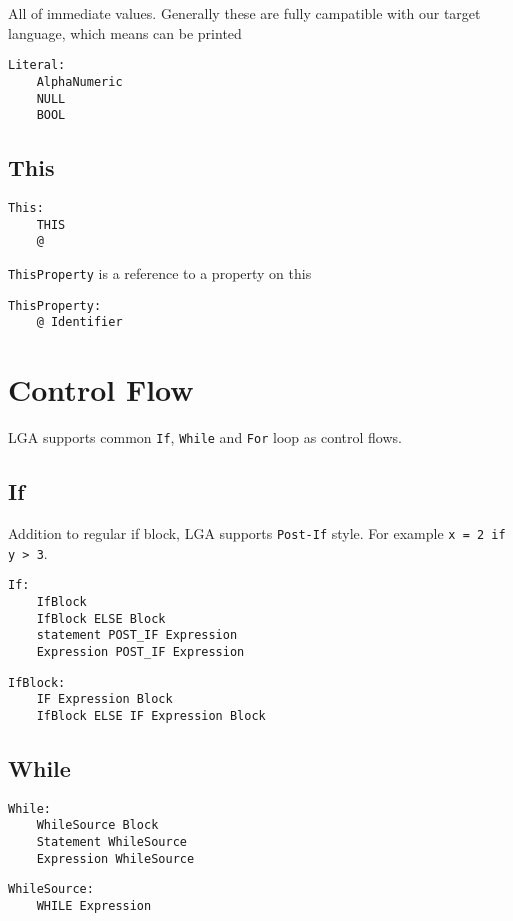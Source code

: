 \documentclass[10pt]{report}
\begin{document}
All of immediate values. Generally these are fully campatible with our target language, which means can be printed
\begin{verbatim}
Literal:
    AlphaNumeric
    NULL
    BOOL
\end{verbatim}

\subsection{This}

\begin{verbatim}
This:
    THIS
    @
\end{verbatim}

\texttt{ThisProperty} is a reference to a property on this
\begin{verbatim}
ThisProperty:
    @ Identifier
\end{verbatim}

\section{Control Flow}

LGA supports common \texttt{If}, \texttt{While} and \texttt{For} loop as control flows.


\subsection{If}
Addition to regular if block, LGA supports \texttt{Post-If} style. For example \texttt{x = 2 if y > 3}.
\begin{verbatim}
If:
    IfBlock
    IfBlock ELSE Block
    statement POST_IF Expression
    Expression POST_IF Expression
\end{verbatim}

\begin{verbatim}
IfBlock:
    IF Expression Block
    IfBlock ELSE IF Expression Block
\end{verbatim}

\subsection{While}
\begin{verbatim}
While:
    WhileSource Block
    Statement WhileSource
    Expression WhileSource
\end{verbatim}

\begin{verbatim}
WhileSource:
    WHILE Expression
\end{verbatim}
\end{document}
